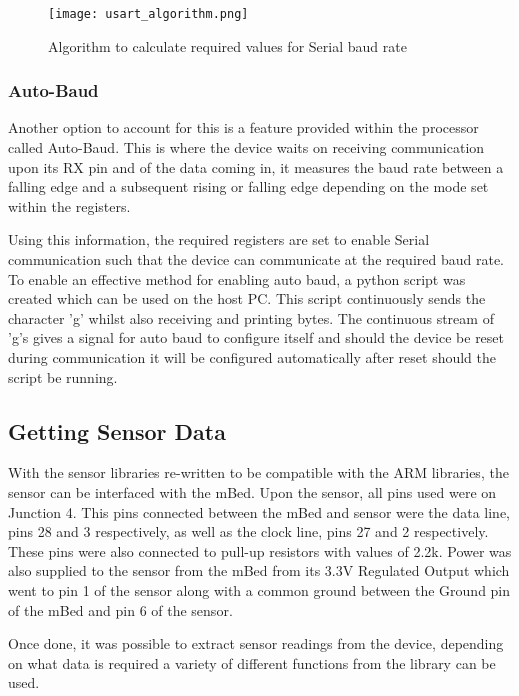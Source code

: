 \begin{figure}
	\centering
	\texttt{[image: usart\_algorithm.png]}
	\caption{Algorithm to calculate required values for Serial baud rate}
	\label{fig:serial_algo}
\end{figure}

\subsubsection{Auto-Baud}

Another option to account for this is a feature provided within the processor called Auto-Baud\cite{mbed_datasheet}. This is where the device waits on receiving communication upon its RX pin and of the data coming in, it measures the baud rate between a falling edge and a subsequent rising or falling edge depending on the mode set within the registers.

Using this information, the required registers are set to enable Serial communication such that the device can communicate at the required baud rate. To enable an effective method for enabling auto baud, a python script was created which can be used on the host PC. This script continuously sends the character 'g' whilst also receiving and printing bytes. The continuous stream of 'g's gives a signal for auto baud to configure itself and should the device be reset during communication it will be configured automatically after reset should the script be running.

\subsection{Getting Sensor Data}

With the sensor libraries re-written to be compatible with the ARM libraries, the sensor can be interfaced with the mBed. Upon the sensor, all pins used were on Junction 4. This pins connected between the mBed and sensor were the data line, pins 28 and 3 respectively, as well as the clock line, pins 27 and 2 respectively. These pins were also connected to pull-up resistors with values of 2.2k\ohm. Power was also supplied to the sensor from the mBed from its 3.3V Regulated Output which went to pin 1 of the sensor along with a common ground between the Ground pin of the mBed and pin 6 of the sensor. 

Once done, it was possible to extract sensor readings from the device, depending on what data is required a variety of different functions from the library can be used.

